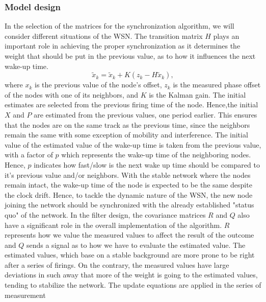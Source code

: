\documentclass[a4paper,10pt]{report}
\begin{document}
\subsubsection{Model design}
In the selection of the matrices for the synchronization algorithm,
we will consider different situations of the WSN.
\newline
The transition matrix $H$ plays an important role in achieving
the proper synchronization as it determines the weight that should
be put in the previous value, as to how it influences the next
wake-up time.
\begin{equation}
\tilde x_k = \tilde x_k + K(z_k-H\tilde x_k) \label{diff},
\end{equation}
where $x_k$ is the previous value of the node's offset, $z_k$ is the measured phase offset of the nodes with one of its neighbors,
and $K$ is the Kalman gain. \newline
The initial estimates are selected from the previous firing time of the node.
Hence,the initial $X$ and $P$ are estimated from the previous values, one period earlier.
This ensures that the nodes are on the same track as the previous time, since the neighbors
remain the same with some exception of mobility and interference. The initial value of the estimated value of the wake-up
time is taken from the previous value, with a factor of $p$ which
represents the wake-up time of the neighboring nodes. Hence, $p$
indicates how fast/slow is the next wake up time should be compared
to it's previous value and/or neighbors. With the stable network where the nodes remain intact,
the wake-up time of the node is expected to be the same despite the
clock drift.\newline
Hence, to tackle the dynamic nature of the WSN, the
new node joining the network should be synchronized with the already
established "status quo" of the network.
In the filter design, the covariance matrices $R$ and $Q$ also have a significant
role in the overall implementation of the algorithm. $R$ represents how
we value the measured values to affect the result of the outcome and $Q$ sends a signal as to how we have to evaluate the estimated
value.
\newline The estimated values, which base on a stable background are more prone to be right after a
series of firings. On the contrary, the measured values have large
deviations in such away that more of the weight is going to the
estimated values, tending to stabilize the network.
\newline The update equations are applied in the series of measurement
\end{document}
